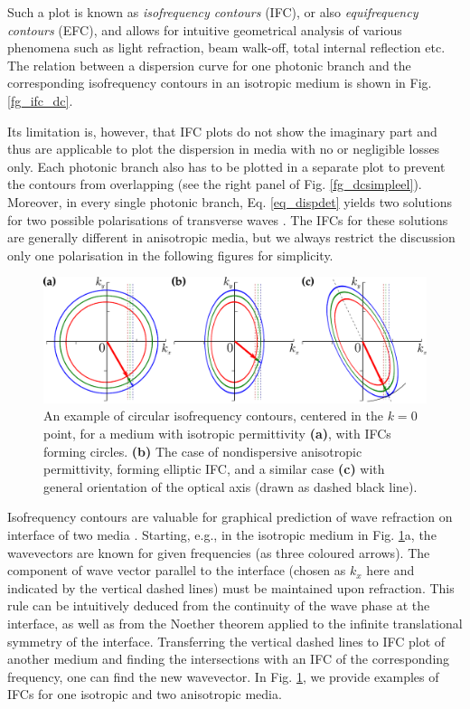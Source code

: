 Such a plot is known as \textit{isofrequency contours} (IFC), or also \textit{equifrequency contours} (EFC), and allows for intuitive geometrical analysis of various phenomena such as light refraction, beam walk-off, total internal reflection etc. 
The relation between a dispersion curve for one photonic branch and the corresponding isofrequency contours in an isotropic medium is shown in Fig. \ref{fg_ifc_dc}.

Its limitation is, however, that IFC plots do not show the imaginary part and thus are applicable to plot the dispersion in media with no or negligible losses only.  
Each photonic branch also has to be plotted in a separate plot to prevent the contours from overlapping (see the right panel of Fig. \ref{fg_dcsimpleel}). 
Moreover, in every single photonic branch, Eq. \ref{eq_dispdet} yields two solutions for two possible polarisations of transverse waves \cite[p. 46]{klingshirn2007semiconductor}. The IFCs for these solutions are generally different in anisotropic media, but we always restrict the discussion only one polarisation in the following figures  for simplicity. %

\begin{figure}[ht] \caption{An example of circular isofrequency contours, centered in the $k=0$ point, for a medium with isotropic permittivity \textbf{(a)}, with IFCs forming circles. 
 \textbf{(b)} The case of nondispersive anisotropic permittivity, forming elliptic IFC, and a similar case \textbf{(c)} with general orientation of the optical axis (drawn as dashed black line).
} \label{fg_ifc} \centering  %
	\includegraphics[width=.8\textwidth]{img/ifc_freqdispersion.pdf} 
\end{figure}
Isofrequency contours are valuable for graphical prediction of wave refraction on interface of two media \cite[p. 118]{shalaev2010book}. Starting, e.g., in the isotropic medium in Fig. \ref{fg_ifc}a, the wavevectors are known for given frequencies (as three coloured arrows).
The component of wave vector parallel to the interface (chosen as $k_x$ here and indicated by the vertical dashed lines) must be maintained upon refraction. This rule can be intuitively deduced from the continuity of the wave phase at the interface, as well as from the Noether theorem applied to the infinite translational symmetry of the interface. Transferring the vertical dashed lines to IFC plot of another medium and finding the intersections with an IFC of the corresponding frequency, one can find the new wavevector. 
In Fig. \ref{fg_ifc}, we provide examples of IFCs for one isotropic and two anisotropic media.

